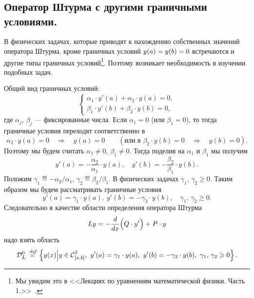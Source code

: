 \chapter{}
\label{lecture7}
\section{Оператор Штурма с другими граничными условиями.}
\label{lecture7section1}
В физических задачах, которые приводят к нахождению собственных значений оператора Штурма, кроме граничных условий $y(a)\?=y(b)=0$ встречаются и другие типы граничных условий\footnote[1]{Мы увидим это в <<Лекциях по уравнениям математической физики. Часть 1.>>~\cite{mathphys}.}. Поэтому возникает необходимость в изучении подобных задач.

Общий вид граничных условий:
\begin{equation*}
	\begin{cases}
		\alpha_1\cdot y'(a)+\alpha_2\cdot y(a)=0,\\
		\beta_1\cdot y'(b)+\beta_2\cdot y(b)=0,
	\end{cases}
\end{equation*} 
где $\alpha_j,\,\beta_j$ --- фиксированные числа. Если $\alpha_1=0$ (или $\beta_1=0$), то тогда граничные условия переходят соответственно в
\begin{equation*}
	\alpha_2\cdot y(a)=0\quad\Rightarrow\quad y(a)=0\qquad(\text{или в }\beta_2\cdot y(b)=0\quad\Rightarrow\quad y(b)=0).
\end{equation*}  
Поэтому мы будем считать $\alpha_1\neq0$, $\beta_1\neq0$. Тогда поделив на $\alpha_1$ и $\beta_1$ мы получим
\begin{equation*}
	 y'(a)=-\frac{\alpha_2}{\alpha_1}\cdot y(a),\quad y'(b)=-\frac{\beta_2}{\beta_1}\cdot y(b).
\end{equation*}
Положим $\gamma_1\eqdef-\alpha_2/\alpha_1$, $\gamma_2\eqdef\beta_2/\beta_1$. В физических задачах $\gamma_1,\,\gamma_2\geqslant0$. Таким образом мы будем рассматривать граничные условия 
\begin{equation}
	\label{l7:eq:1}
	 y'(a)=\gamma_1\cdot y(a),\  y'(b)=-\gamma_2\cdot y(b),\quad\gamma_1,\,\gamma_2\geqslant0.
\end{equation} 
Следовательно в качестве области определения оператора Штурма 
\begin{equation*}
	 Ly=-\frac{d}{dx}\Big(Q\cdot y'\Big)+P\cdot y
\end{equation*}
надо взять область
\begin{equation*}
	\mc{D}_{L}^0\eqdef\left\{y(x)\middle|y\in\Cfn[{[a,b]}]{2},\ y'(a)=\gamma_1\cdot y(a),\ y'(b)=-\gamma_2\cdot y(b),\ \gamma_1,\,\gamma_2\geqslant0\right\}.
\end{equation*}
